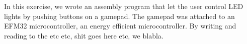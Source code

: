 In this exercise, we wrote an assembly program that let the user control LED lights by pushing buttons on a gamepad. The gamepad was attached to an EFM32 microcontroller, an energy efficient microcontroller. By writing and reading to the etc etc, shit goes here etc, we blabla.
